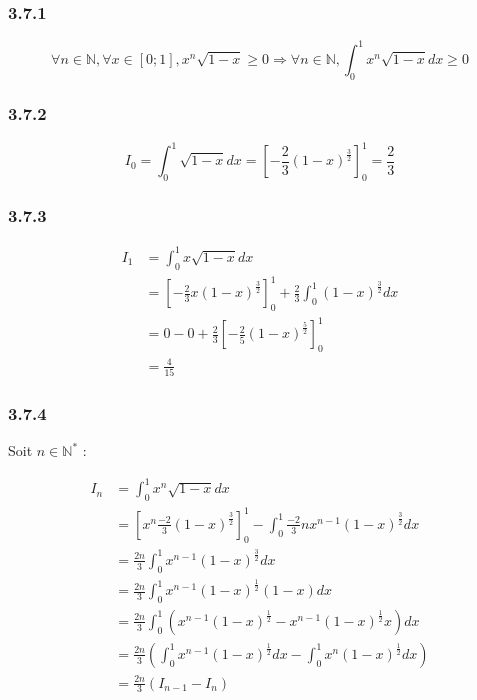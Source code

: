 \documentclass[a4paper,10pt]{report}
\begin{document}
\subsubsection*{3.7.1}
\begin{displaymath}
	\forall n \in \mathbb{N}, \forall x \in [0;1], x^n\sqrt{1-x} \geq 0 \Longrightarrow	\forall n \in \mathbb{N}, \int_0^1 x^n\sqrt{1-x}dx \geq 0
\end{displaymath}

\subsubsection*{3.7.2}
\begin{displaymath}
		I_0 = \int_0^1 \sqrt{1-x} dx = \left[ -\frac{2}{3} (1-x)^\frac{3}{2}\right]_0^1 = \frac{2}{3}
\end{displaymath}

\subsubsection*{3.7.3}
\begin{equation*}
	\begin{split}
			I_1 &= \int_0^1 x\sqrt{1-x} dx \\
			    &= \left[ -\frac{2}{3} x(1-x)^\frac{3}{2}\right]_0^1 +\frac{2}{3}\int_0^1 (1-x)^\frac{3}{2} dx \\
			    &= 0 - 0  + \frac{2}{3}  \left[ -\frac{2}{5} (1-x)^\frac{5}{2}\right]_0^1 \\
			    &= \frac{4}{15}
	\end{split}
\end{equation*}

\subsubsection*{3.7.4}
Soit $n \in \mathbb{N}^*$ :

\begin{equation*}
	\begin{split}
		I_n &=  \int_0^1 x^n\sqrt{1-x} dx \\
		    &= \left[  x^n \frac{-2}{3} (1-x)^\frac{3}{2}\right]_0^1  - \int_0^1 \frac{-2}{3}nx^{n-1}(1-x)^\frac{3}{2} dx\\
		    &= \frac{2n}{3} \int_0^1 x^{n-1}(1-x)^\frac{3}{2} dx \\
		    &= \frac{2n}{3} \int_0^1 x^{n-1}(1-x)^\frac{1}{2}(1-x) dx \\
		    &= \frac{2n}{3} \int_0^1 \left( x^{n-1}(1-x)^\frac{1}{2}-x^{n-1}(1-x)^\frac{1}{2}x \right)dx \\
		    &= \frac{2n}{3} \left( \int_0^1 x^{n-1}(1-x)^\frac{1}{2} dx - \int_0^1 x^{n}(1-x)^\frac{1}{2} dx \right) \\
		    &= \frac{2n}{3} \left( I_{n-1} - I_n \right) \\
	\end{split}
\end{equation*}
\end{document}
